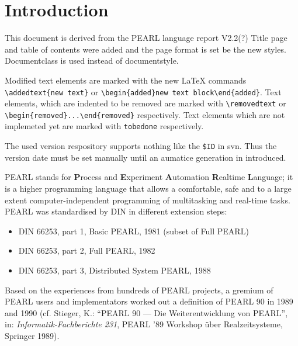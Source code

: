 \chapter{Introduction}   %

\begin{added}
This document is derived from the PEARL language report V2.2(?)
Title page and table of contents were added and the page format 
is set be the new styles. Documentclass is used instead of documentstyle.

Modified text elements are marked with the new LaTeX commands
\verb+\addedtext{new text}+ or \verb+\begin{added}new text block\end{added}+.
Text elements, which are indented to be removed are marked with
\verb+\removedtext+ or \verb+\begin{removed}...\end{removed}+ respectively.
Text elements which are not implemeted yet are marked with \verb|tobedone| respectively.

The used version respository supports nothing like the \verb|$ID| in svn.
Thus the version date must be set manually until an aumatice generation 
in introduced.
\end{added}


PEARL stands for {\bf P}rocess and {\bf E}xperiment {\bf A}utomation
{\bf R}ealtime {\bf L}anguage; it is a higher programming language that
allows a comfortable, safe and to a large extent computer-independent
programming of multitasking and real-time tasks. PEARL was standardised 
by DIN in different extension steps:

\begin{itemize}
\item DIN 66253, part 1, Basic PEARL, 1981 (subset of Full PEARL)
\item DIN 66253, part 2, Full PEARL, 1982
\item DIN 66253, part 3, Distributed System PEARL, 1988
\end{itemize}

Based on the experiences from hundreds of PEARL projects, a gremium of
PEARL users and implementators worked out a definition of PEARL 90 in
1989 and 1990 (cf. Stieger, K.: ``PEARL 90 --- Die Weiterentwicklung von
PEARL'', in: {\em Informatik-Fachberichte 231}, PEARL '89 Workshop
\"uber Realzeitsysteme, Springer 1989).

